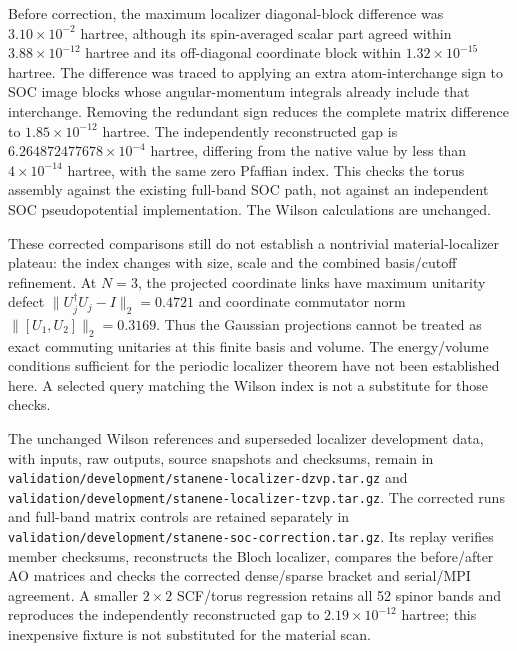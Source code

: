 \documentclass[11pt]{article}
\begin{document}
Before correction, the maximum localizer diagonal-block difference
was $3.10\times10^{-2}$ hartree, although its spin-averaged scalar
part agreed within $3.88\times10^{-12}$ hartree and its off-diagonal
coordinate block within $1.32\times10^{-15}$ hartree. The difference
was traced to applying an extra atom-interchange sign to SOC image
blocks whose angular-momentum integrals already include that
interchange. Removing the redundant sign reduces the complete
matrix difference to $1.85\times10^{-12}$ hartree. The independently
reconstructed gap is $6.264872477678\times10^{-4}$ hartree, differing
from the native value by less than $4\times10^{-14}$ hartree, with
the same zero Pfaffian index. This checks the torus assembly against
the existing full-band SOC path, not against an independent SOC
pseudopotential implementation. The Wilson calculations are unchanged.

These corrected comparisons still do not establish a nontrivial
material-localizer plateau: the index changes with size, scale and
the combined basis/cutoff refinement. At $N=3$, the projected
coordinate links have maximum unitarity defect
$\lVert U_j^\dagger U_j-I\rVert_2=0.4721$ and coordinate commutator
norm $\lVert[U_1,U_2]\rVert_2=0.3169$. Thus the Gaussian projections
cannot be treated as exact commuting unitaries at this finite basis
and volume. The energy/volume conditions sufficient for the periodic
localizer theorem have not been established here. A selected query
matching the Wilson index is not a substitute for those checks.

The unchanged Wilson references and superseded localizer development
data, with inputs, raw outputs, source snapshots and checksums, remain in
\nolinkurl{validation/development/stanene-localizer-dzvp.tar.gz} and
\nolinkurl{validation/development/stanene-localizer-tzvp.tar.gz}.
The corrected runs and full-band matrix controls are retained separately
in \nolinkurl{validation/development/stanene-soc-correction.tar.gz}.
Its replay verifies member checksums, reconstructs the Bloch localizer,
compares the before/after AO matrices and checks the corrected
dense/sparse bracket and serial/MPI agreement. A smaller $2\times2$
SCF/torus regression retains all 52 spinor bands and reproduces the
independently reconstructed gap to $2.19\times10^{-12}$ hartree;
this inexpensive fixture is not substituted for the material scan.
\end{document}
